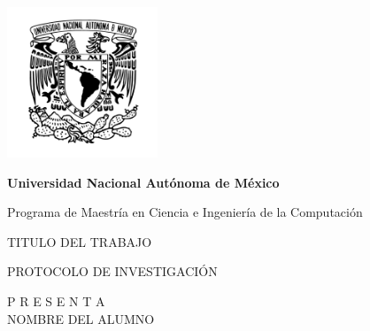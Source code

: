 \documentclass[letterpaper,12pt,oneside]{article}
\begin{document}
\begin{titlepage}
		\setlength{\parindent}{0pt} \setlength{\parskip}{0pt}
	
		\begin{center}
			\vfill 
			
			\begin{minipage}{\textwidth}
				
				
				\begin{center}
					\includegraphics[width=4.5cm]{UNAM_LOGO2.png}	
				\end{center} 	
				\begin{center}
					\Huge\textbf{Universidad Nacional Autónoma de México}
				\end{center} 
				
			\end{minipage}
				
			\vfill
			
			\begin{minipage}{0.7\textwidth}
				\begin{center}
					\large Programa de Maestría en Ciencia e Ingeniería de la Computación
				\end{center}
			\end{minipage}
			\begin{center}
				\vfill
				\large TITULO DEL TRABAJO
				
			\end{center}
			
			\begin{center}
				
				 PROTOCOLO DE INVESTIGACIÓN\\
			
				
				\begin{center}
					P R E S E N T A \\
					\large NOMBRE DEL ALUMNO
				\end{center}
				

\end{center}
\end{center}
\end{titlepage}
\end{document}
